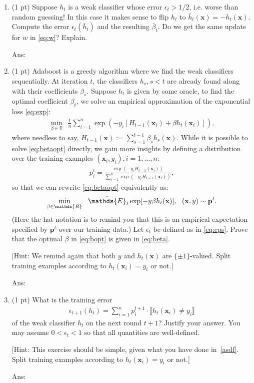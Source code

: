 \documentclass[10pt,letterpaper]{article}
\newcommand{\RR}{\mathds{R}}
\newcommand{\xv}{\mathbf{x}}
\newcommand{\ans}[1]{{\color{orange}\textsf{Ans}: #1}}
\newcommand{\pred}[1]{\llbracket#1\rrbracket}
\newcommand{\EE}{\mathds{E}}
\newcommand{\pv}{\mathbf{p}}
\begin{document}
\begin{exercise}
\begin{enumerate}[label=\alph*)]
		[Any function can be approximated arbitrarily well by additive functions but clearly not by linear functions, thus the power of Adaboost.]

\ans{} 
		\item (1 pt) Suppose $h_t$ is a weak classifier whose error $\epsilon_t > 1/2$, i.e. worse than random guessing! In this case it makes sense to flip $h_t$ to $\bar h_t (\xv) = - h_t(\xv)$. Compute the error $\epsilon_t(\bar h_t)$ and the resulting $\bar \beta_t$. Do we get the same update for $w$ in \eqref{eq:w}? Explain.

\ans{} 
		\item (1 pt) Adaboost is a greedy algorithm where we find the weak classifiers sequentially. At iteration $t$, the classifiers $h_{s}, s < t$ are already found along with their coefficients $\beta_s$. Suppose $h_t$ is given by some oracle, to find the optimal coefficient $\beta_t$, we solve an empirical approximation of the exponential loss \eqref{eq:exp}:
      \label{asdf}
		\begin{align}
		\label{eq:betaopt}
		\min_{\beta\in\RR} ~~ \frac{1}{n}\sum_{i=1}^n \exp(- y_i [H_{t-1}(\xv_i) + \beta h_t(\xv_i)]),
		\end{align}
		where needless to say, $H_{t-1}(\xv) := \sum_{s=1}^{t-1} \beta_s h_s(\xv)$.
		While it is possible to solve \eqref{eq:betaopt} directly, we gain more insights by defining a distribution over the training examples $(\xv_i, y_i), i=1, \ldots, n$:
		\begin{align}
		p_i^t = \frac{\exp(- y_i H_{t-1}(\xv_i))}{\sum_{i=1}^n \exp(- y_i H_{t-1}(\xv_i))},
		\end{align}
		so that we can rewrite \eqref{eq:betaopt} equivalently as:
		\begin{align}
		\label{eq:bopt}
		\min_{\beta \in \RR} ~~ \hat\EE_t \exp[- y \beta h_t(\xv)], ~~ (\xv, y) \sim \pv^t.
		\end{align}
		(Here the hat notation is to remind you that this is an empirical expectation specified by $\pv^t$ over our training data.) Let $\epsilon_t$ be defined as in \eqref{eq:eps}. Prove that the optimal $\beta$ in \eqref{eq:bopt} is given in \eqref{eq:beta}.

		[Hint: We remind again that both $y$ and $h_t(\xv)$ are $\{\pm 1\}$-valued. Split training examples according to $h_t(\xv_i) = y_i$ or not.]

\ans{} 
		\item (1 pt) What is the training error
		\begin{align}
		\epsilon_{t+1}(h_t) = \sum_{i=1}^n p^{t+1}_i \cdot \pred{h_t(\xv_i) \ne y_i}
		\end{align}
		of the weak classifier $h_t$ on the next round $t+1$? Justify your answer. You may assume $0 < \epsilon_t < 1$ so that all quantities are well-defined.

      [Hint: This exercise should be simple, given what you have done in~\ref{asdf}. Split training examples according to $h_t(\xv_i) = y_i$ or not.]

  \ans{} 
	\end{enumerate}

\end{exercise}
\end{document}
